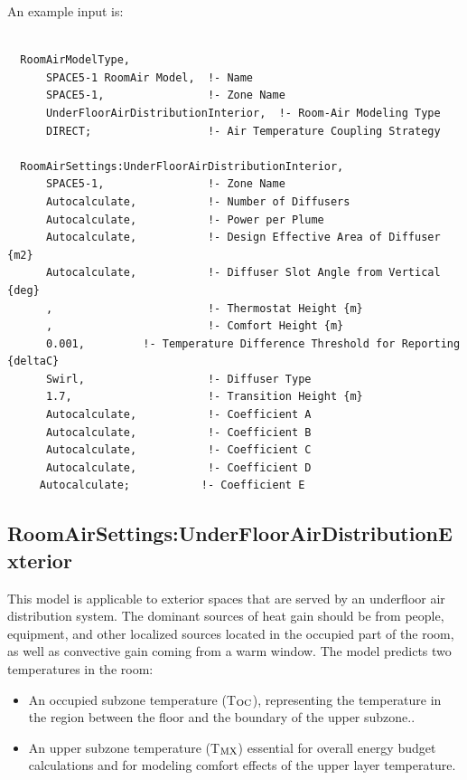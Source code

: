 An example input is:

\begin{lstlisting}

  RoomAirModelType,
      SPACE5-1 RoomAir Model,  !- Name
      SPACE5-1,                !- Zone Name
      UnderFloorAirDistributionInterior,  !- Room-Air Modeling Type
      DIRECT;                  !- Air Temperature Coupling Strategy

  RoomAirSettings:UnderFloorAirDistributionInterior,
      SPACE5-1,                !- Zone Name
      Autocalculate,           !- Number of Diffusers
      Autocalculate,           !- Power per Plume
      Autocalculate,           !- Design Effective Area of Diffuser {m2}
      Autocalculate,           !- Diffuser Slot Angle from Vertical {deg}
      ,                        !- Thermostat Height {m}
      ,                        !- Comfort Height {m}
      0.001,         !- Temperature Difference Threshold for Reporting {deltaC}
      Swirl,                   !- Diffuser Type
      1.7,                     !- Transition Height {m}
      Autocalculate,           !- Coefficient A
      Autocalculate,           !- Coefficient B
      Autocalculate,           !- Coefficient C
      Autocalculate,           !- Coefficient D
     Autocalculate;           !- Coefficient E
\end{lstlisting}

\subsection{RoomAirSettings:UnderFloorAirDistributionExterior}\label{roomairsettingsunderfloorairdistributionexterior}

This model is applicable to exterior spaces that are served by an underfloor air distribution system. The dominant sources of heat gain should be from people, equipment, and other localized sources located in the occupied part of the room, as well as convective gain coming from a warm window. The model predicts two temperatures in the room:

\begin{itemize}
\item
  An occupied subzone temperature (T\(_{\rm{OC}}\)), representing the temperature in the region between the floor and the boundary of the upper subzone..
\item
  An upper subzone temperature (T\(_{\rm{MX}}\)) essential for overall energy budget calculations and for modeling comfort effects of the upper layer temperature.
\end{itemize}

